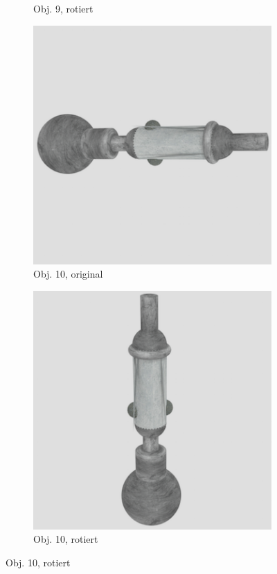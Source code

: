 \begin{figure}
\begin{subfigure}{0.2\textwidth}
\caption{Obj. 9, rotiert} \label{fig:d}
\end{subfigure} \hspace{.5cm}%
\begin{subfigure}{0.2\textwidth}
\includegraphics[width=\linewidth]{Bilder/Objekt10A.png}
\caption{Obj. 10, original} \label{fig:e}
\end{subfigure}\hspace{.5cm}
\begin{subfigure}{0.2\textwidth}
\includegraphics[width=\linewidth]{Bilder/Objekt10B.png}
\caption{Obj. 10, rotiert} \label{fig:f}
\end{subfigure}\hspace{.5cm}


\end{figure}
